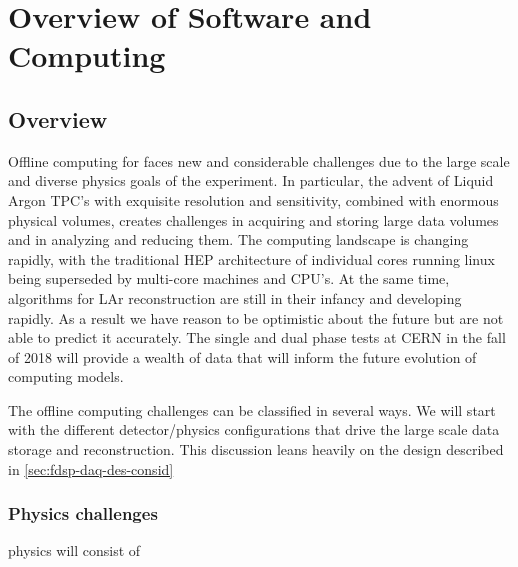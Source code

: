 %
\chapter{Overview of Software and Computing }

\section{Overview}

Offline computing for   faces new and considerable challenges due to the large scale and diverse physics goals of the experiment.  In particular, the advent of Liquid Argon TPC's with exquisite resolution and sensitivity, combined with enormous physical volumes, creates challenges in acquiring and storing large data volumes and in analyzing and reducing them.  The computing landscape is changing rapidly, with the traditional HEP architecture of individual cores running linux being superseded by multi-core machines and CPU's. At the same time, algorithms for LAr reconstruction are still in their infancy and developing rapidly.  As a result we have reason to be optimistic about the future but are not able to predict it accurately.  The  single and dual phase tests at CERN in the fall of 2018 will provide a wealth of data that will inform the future evolution of   computing models.

The   offline computing challenges can be classified in several ways.  We will start with the different detector/physics configurations that drive the large scale data storage and reconstruction. 
This discussion leans heavily on the  design described in \ref{sec:fdsp-daq-des-consid}


\subsection{Physics challenges}

  physics will consist of 

